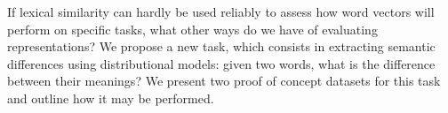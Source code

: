 If lexical similarity can hardly be used reliably to assess how word vectors will perform on specific tasks, what other ways do we have of evaluating representations? We propose a new task, which consists in extracting semantic differences using distributional models: given two words, what is the difference between their meanings? We present two proof of concept datasets for this task and outline how it may be performed.
